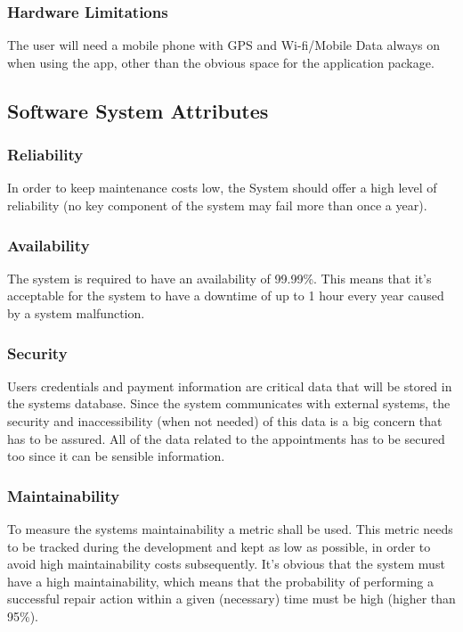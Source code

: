 \documentclass[12pt]{article}
\begin{document}
\subsubsection{Hardware Limitations}
The user will need a mobile phone with GPS and Wi-fi/Mobile Data always on when using the app, other than the obvious space for the application package.

\subsection{Software System Attributes}

\subsubsection{Reliability}
In order to keep maintenance costs low, the System should offer a high level of reliability (no key component of the system may fail more than once a year). 

\subsubsection{Availability}
The system is required to have an availability of 99.99\%. This means that it’s acceptable for the system to have a downtime of up to 1 hour every year caused by a system malfunction.

\subsubsection{Security}
Users credentials and payment information are critical data that will be stored in the systems database. Since the system communicates with external systems, the security and inaccessibility (when not needed) of this data is a big concern that has to be assured. All of the data related to the appointments has to be secured too since it can be sensible information. 

\subsubsection{Maintainability}
To measure the systems maintainability a metric shall be used. This metric needs to be tracked during the development and kept as low as possible, in order to avoid high maintainability costs subsequently. It's obvious that the system must have a high maintainability, which means that the probability of performing a successful repair action within a given (necessary) time must be high (higher than 95\%).
\end{document}
